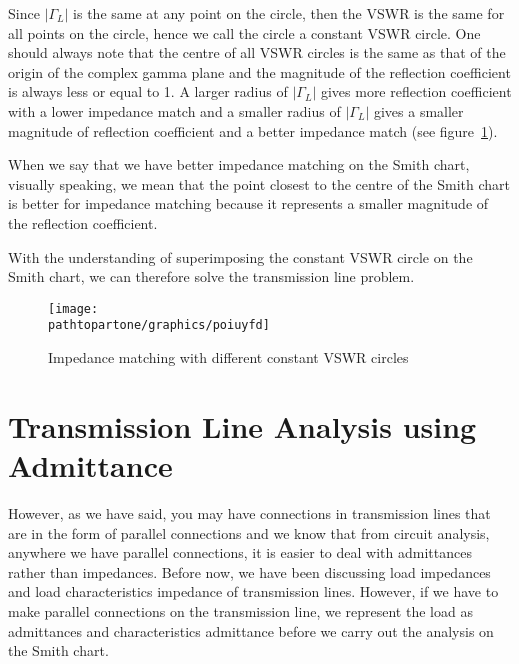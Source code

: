 Since $|\Gamma_L|$ is the same at any point on the circle, then the VSWR is the same for all points on the circle, hence we call the circle a constant VSWR circle. 
One should always note that the centre of all VSWR circles is the same as that of the origin of the complex gamma plane and the magnitude of the reflection coefficient is always less or equal to 1. A larger radius of $|\Gamma_L|$ gives more reflection coefficient with a lower impedance match and a smaller radius of $|\Gamma_L|$ gives a smaller magnitude of reflection coefficient and a better impedance match (see figure~\ref{fig:poiuyfd}).

When we say that we have better impedance matching on the Smith chart, visually speaking, we mean that the point closest to the centre of the Smith chart is better for impedance matching because it represents a smaller magnitude of the reflection coefficient. 

With the understanding of superimposing the constant VSWR circle on the Smith chart, we can therefore solve the transmission line problem.
\begin{figure}[h]
\centering
\texttt{[image: \\pathtopartone/graphics/poiuyfd]}
\caption{Impedance matching with different constant VSWR circles}
\label{fig:poiuyfd}
\end{figure}

\section{Transmission Line Analysis using Admittance}
However, as we have said, you may have connections in transmission lines that are in the form of parallel connections and we know that from circuit analysis, anywhere we have parallel connections, it is easier to deal with admittances rather than impedances. Before now, we have been discussing load impedances and load characteristics impedance of transmission lines. However, if we have to make parallel connections on the transmission line, we represent the load as admittances and characteristics admittance before we carry out the analysis on the Smith chart. 

